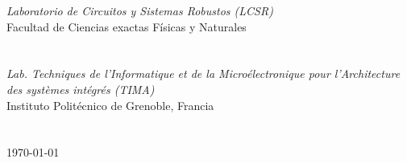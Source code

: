 \documentclass[a4paper,openright,12pt]{report}
\begin{document}
\begin{titlepage}
\begin{center}
\begin{table}[H]
\end{table}

\large \textit{Laboratorio de Circuitos y Sistemas Robustos (LCSR)}\\ Facultad de Ciencias exactas Físicas y Naturales
\large \textit{}\\
\large \textit{}\\
\large \textit{}\\
\large \textit{ Lab. Techniques de l'Informatique et de la Microélectronique pour l'Architecture des systèmes intégrés (TIMA)}\\ Instituto Politécnico de Grenoble, Francia
 \large \textit{}\\
  \large \textit{}\\
   \large \textit{}\\
{\large \today}\\[2cm] %
 
\vfill
\end{center}
\end{titlepage}


$\ $
\thispagestyle{empty} %
% 


\end{document}
